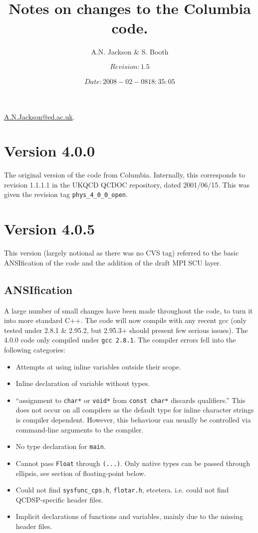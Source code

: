 \documentclass[12pt]{article}
\title{Notes on changes to the Columbia code.}
\author{A.N. Jackson \& S. Booth}
\date{\mbox{\small $$Revision: 1.5 $$  $$Date: 2008-02-08 18:35:05 $$}}
\newcommand{\cde}[1]{{\tt #1}}            %
\begin{document}
\maketitle

\begin{flushright}
\href{mailto:A.N.Jackson@ed.ac.uk}{A.N.Jackson@ed.ac.uk}.
\end{flushright}

\tableofcontents

\newpage

\section{Version 4.0.0}
The original version of the code from Columbia.  Internally, this corresponds
to revision 1.1.1.1 in the UKQCD QCDOC repository, dated 2001/06/15.  
This was given the revision tag \cde{phys\_4\_0\_0\_open}. 

\section{Version 4.0.5}
This version (largely notional as there was no CVS tag) referred to the basic
ANSIfication of the code and the addition of the draft MPI SCU layer.

\subsection{ANSIfication}
\label{405ANSI}
A large number of small changes have been made throughout the code, to
turn it into more standard C++.  The code will now compile with any recent gcc
(only tested under 2.8.1 \& 2.95.2, but 2.95.3+ should present few serious
issues).  The 4.0.0 code only compiled under \cde{gcc 2.8.1}.  The compiler errors
fell into the following categories:
\begin{itemize}
 \item Attempts at using inline variables outside their scope.
 \item Inline declaration of variable without types.  
 \item ``assignment to \cde{char*} or \cde{void*} from \cde{const char*}
 discards qualifiers.''  This does not occur on all compilers as the default
 type for inline character strings is compiler dependent.  However, this behaviour 
 can usually be controlled via command-line arguments to the compiler.
 \item No type declaration for \cde{main}.
 \item Cannot pass \cde{Float} through \cde{(...)}.  Only native types can be
 passed through ellipsis, see section of floating-point below.
 \item Could not find \cde{sysfunc_cps.h}, \cde{flotar.h},
 etcetera. i.e. could not find QCDSP-specific header files.
 \item Implicit declarations of functions and variables, mainly due
 to the missing header files.
\end{itemize}
\end{document}
